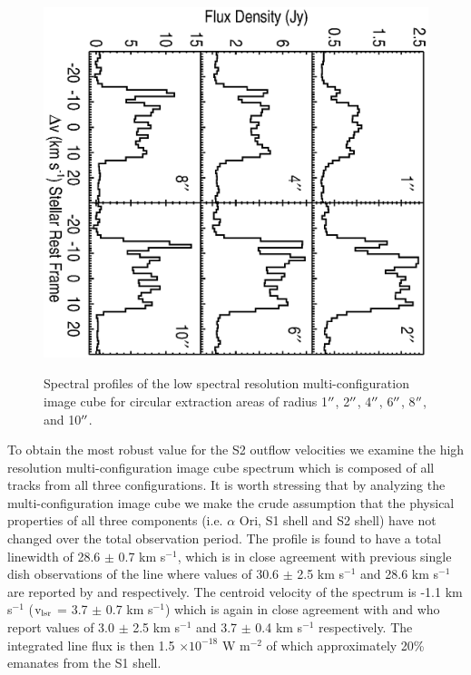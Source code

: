 \documentclass[iop]{emulateapj}
\begin{document}
\begin{figure}
\includegraphics[scale=0.75, angle=90, width=13.0cm, height=11cm, trim=20pt 50pt 20pt 40pt]{test.eps}
\caption{Spectral profiles of the low spectral resolution multi-configuration image cube for circular extraction areas of radius 1$\mbox{$^{\prime\prime}$}$, 2$\mbox{$^{\prime\prime}$}$, 4$\mbox{$^{\prime\prime}$}$, 6$\mbox{$^{\prime\prime}$}$, 8$\mbox{$^{\prime\prime}$}$, and 10$\mbox{$^{\prime\prime}$}$.}
\label{fig:fig2}
\end{figure}

To obtain the most robust value for the S2 outflow velocities we examine the high resolution multi-configuration image cube spectrum which is composed of all tracks from all three configurations. It is worth stressing that by analyzing the multi-configuration image cube we make the crude assumption that the physical properties of all three components (i.e. $\alpha$ Ori, S1 shell and S2 shell) have not changed over the total observation period. The profile is found to have a total linewidth of 28.6 $\pm$ 0.7 km s${}^{-1}$, which is in close agreement with previous single dish observations of the line where values of 30.6 $\pm$ 2.5 km s${}^{-1}$ and 28.6 km s${}^{-1}$ are reported by \cite{1980ApJ...242L..25K} and \cite{1987ApJ...313..400H} respectively. The centroid velocity of the spectrum is  -1.1 km s${}^{-1}$ ($\rm{v_{lsr}}$ = 3.7 $\pm$ 0.7 km s${}^{-1}$) which is again in close agreement with \cite{1980ApJ...242L..25K} and \cite{1987ApJ...313..400H} who report values of 3.0 $\pm$ 2.5 km s${}^{-1}$ and 3.7 $\pm$ 0.4 km s${}^{-1}$ respectively. The integrated line flux is then 1.5 $\times 10^{-18}$ W m$^{-2}$ of which approximately 20\% emanates from the S1 shell.
\end{document}
